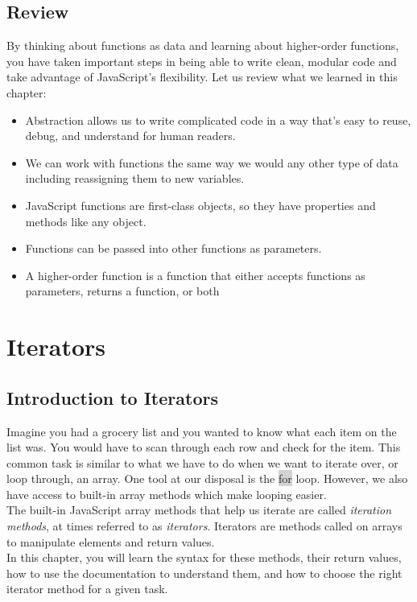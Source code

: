\documentclass[11pt]{article}
\begin{document}
\subsection{Review}
By thinking about functions as data and learning about higher-order functions, you have taken important steps in being able to write clean, modular code and take advantage of JavaScript’s flexibility. Let us review what we learned in this chapter:
\begin{itemize}[leftmargin = *]
\item Abstraction allows us to write complicated code in a way that’s easy to reuse, debug, and understand for human readers. 
\item We can work with functions the same way we would any other type of data including reassigning them to new variables. 
\item JavaScript functions are first-class objects, so they have properties and methods like any object. 
\item Functions can be passed into other functions as parameters. 
\item A higher-order function is a function that either accepts functions as parameters, returns a function, or both
\end{itemize}

\newpage
\section{Iterators}
\subsection{Introduction to Iterators}
Imagine you had a grocery list and you wanted to know what each item on the list was. You would have to scan through each row and check for the item. This common task is similar to what we have to do when we want to iterate over, or loop through, an array. One tool at our disposal is the \colorbox{lightgray}{for} loop. However, we also have access to built-in array methods which make looping easier. \\
\newline
The built-in JavaScript array methods that help us iterate are called \textit{iteration methods}, at times referred to as \textit{iterators}. Iterators are methods called on arrays to manipulate elements and return values. \\
\newline
In this chapter, you will learn the syntax for these methods, their return values, how to use the documentation to understand them, and how to choose the right iterator method for a given task.
\end{document}
